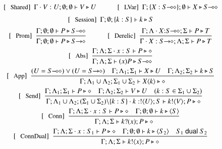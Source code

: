 \begin{figure}[!t]
\[
	\begin{array}{c}
		\trule{Shared}~~\Gamma \cat V:U; \emptyset; \emptyset \proves V \hastype U
		\qquad\quad
		\trule{LVar}~~\Gamma; \set{X: \lhot{S}}; \emptyset \proves X \hastype \lhot{S} 
		\\[2mm]

		\trule{Session}~~\Gamma; \emptyset; \set{k:S} \proves k \hastype S 
		\\[2mm]

		\trule{Prom}~~\tree{
			\Gamma; \emptyset; \emptyset \proves P \hastype \lhot{S}
		}{
			\Gamma; \emptyset; \emptyset \proves P \hastype \shot{S}
		} 
		\qquad\quad  
		\trule{Derelic}~~\tree{
			\Gamma; \Lambda \cat X{:}\lhot{S}; \Sigma \proves P \hastype T
		}{
			\Gamma \cat X:\shot{S}; \Lambda; \Sigma \proves P \hastype T
		} 
		\\[4mm]

		\trule{Abs}~~\tree{
			\Gamma; \Lambda; \Sigma \cat x: S \proves P \hastype \Proc
		}{
			\Gamma; \Lambda; \Sigma \proves \abs{x}{P} \hastype \lhot{S}
		}
		\\[4mm]

		\trule{App}~~\tree{(U = \lhot{S}) \lor (U = \shot{S}) \quad \Gamma; \Lambda_1; \Sigma_1 \proves X \hastype U  \quad \Gamma; \Lambda_2; \Sigma_2 \proves k \hastype S
		}{
			\Gamma; \Lambda_1 \cup \Lambda_2; \Sigma_1 \cup \Sigma_2 \proves \appl{X}{k} \hastype \Proc
		} 
		\\[4mm]

		\trule{Send}~~\tree{
			\Gamma; \Lambda_1; \Sigma_1 \proves P \hastype \Proc  \quad \Gamma; \Lambda_2; \Sigma_2 \vdash V \hastype U  \quad (k:S \in \Sigma_1 \cup \Sigma_2)
		}{
			\Gamma; \Lambda_1 \cup \Lambda_2; (\Sigma_1 \cup \Sigma_2)\backslash\set{k:S} \cat k:\btout{U} S \proves \bout{k}{V} P \hastype \Proc
		}

		\\[4mm]
		\trule{Conn}~~\tree{
			\Gamma; \Lambda; \Sigma \cat x:S \proves P \hastype \Proc  \quad \Gamma; \emptyset; \emptyset \proves k \hastype \chtype{S}
		}{
			\Gamma; \Lambda; \Sigma \proves \binp{k}{x} P \hastype \Proc
		}
		\\[4mm]
		\trule{ConnDual}~~\tree{
			\Gamma; \Lambda; \Sigma \cat x: S_1 \proves P \hastype \Proc  \quad \Gamma; \emptyset; \emptyset \proves k \hastype \chtype{S_2} \quad S_1 \dualof S_2
		}{
			\Gamma; \Lambda; \Sigma \proves \bout{k}{x} P \hastype \Proc
		}
		\\[4mm]


\end{array}\]
\end{figure}
